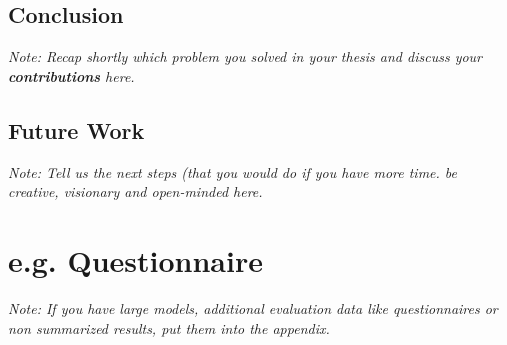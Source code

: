 \documentclass[a4paper,12pt,twoside]{report}
\begin{document}
\section{Conclusion}

\textit{Note: Recap shortly which problem you solved in your thesis and discuss your \textbf{contributions} here.}

\section{Future Work}

\textit{Note: Tell us the next steps  (that you would do if you have more time. be creative, visionary and open-minded here.}



\appendix

\chapter{e.g. Questionnaire}

\textit{Note: If you have large models, additional evaluation data like questionnaires or non summarized results, put them into the appendix.}


\clearpage

\listoffigures
\clearpage

\listoftables
\clearpage



\end{document}
